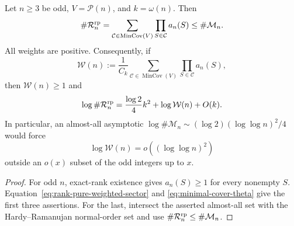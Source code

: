 \begin{corollary}
\label{cor:odd-weighted-cover-obstruction}
Let $n\geq3$ be odd, $V=\mathcal P(n)$, and $k=\omega(n)$.  Then
\begin{equation}\label{eq:odd-weighted-rank-pure-sector}
 \#\mathcal R_n^{\rm rp}
 =\sum_{\mathcal C\in\operatorname{MinCov}(V)}
       \prod_{S\in\mathcal C}a_n(S)
 \leq\#\mathcal M_n.
\end{equation}
All weights are positive.  Consequently, if
\begin{equation}\label{eq:weighted-cover-excess}
 \mathcal W(n):=\frac1{C_k}
 \sum_{\mathcal C\in\operatorname{MinCov}(V)}
       \prod_{S\in\mathcal C}a_n(S),
\end{equation}
then $\mathcal W(n)\geq1$ and
\begin{equation}\label{eq:odd-rank-pure-log-decomposition}
 \log\#\mathcal R_n^{\rm rp}
 =\frac{\log2}{4}k^2+\log\mathcal W(n)+O(k).
\end{equation}
In particular, an almost-all asymptotic
$\log\#\mathcal M_n\sim(\log2)(\log\log n)^2/4$ would force
\begin{equation}\label{eq:weighted-cover-dispersion-interface}
 \log\mathcal W(n)=o((\log\log n)^2)
\end{equation}
outside an $o(x)$ subset of the odd integers up to $x$.
\end{corollary}

\begin{proof}
For odd $n$, exact-rank existence gives $a_n(S)\geq1$ for every nonempty
$S$.  Equation~\eqref{eq:rank-pure-weighted-sector} and
\eqref{eq:minimal-cover-theta} give the first three assertions.  For the last,
intersect the asserted almost-all set with the Hardy--Ramanujan normal-order
set and use $\#\mathcal R_n^{\rm rp}\leq\#\mathcal M_n$.
\end{proof}
